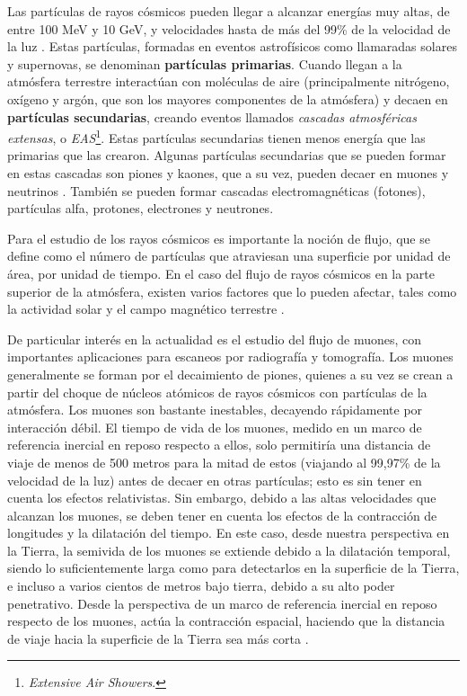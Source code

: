 \documentclass[12pt]{report}
\begin{document}
Las partículas de rayos cósmicos pueden llegar a alcanzar energías muy altas, de entre 100 MeV y 10 GeV, y velocidades hasta de más del 99\% de la velocidad de la luz \cite{moldwin2008introduction}. Estas partículas, formadas en eventos astrofísicos como llamaradas solares y supernovas, se denominan \textbf{partículas primarias}. Cuando llegan a la atmósfera terrestre interactúan con moléculas de aire (principalmente nitrógeno, oxígeno y argón, que son los mayores componentes de la atmósfera) y decaen en \textbf{partículas secundarias}, creando eventos llamados \textit{cascadas atmosféricas extensas}, o \textit{EAS}\footnote{\textit{Extensive Air Showers}.}. Estas partículas secundarias tienen menos energía que las primarias que las crearon. Algunas partículas secundarias que se pueden formar en estas cascadas son piones y kaones, que a su vez, pueden decaer en muones y neutrinos \cite{grieder2010extensive}. También se pueden formar cascadas electromagnéticas (fotones), partículas alfa, protones, electrones y neutrones.

Para el estudio de los rayos cósmicos es importante la noción de flujo, que se define como el número de partículas que atraviesan una superficie por unidad de área, por unidad de tiempo. En el caso del flujo de rayos cósmicos en la parte superior de la atmósfera, existen varios factores que lo pueden afectar, tales como la actividad solar y el campo magnético terrestre \cite{PhysRevD.98.030001}.

De particular interés en la actualidad es el estudio del flujo de muones, con importantes aplicaciones para escaneos por radiografía y tomografía. Los muones generalmente se forman por el decaimiento de piones, quienes a su vez se crean a partir del choque de núcleos atómicos de rayos cósmicos con partículas de la atmósfera. Los muones son bastante inestables, decayendo rápidamente por interacción débil. El tiempo de vida de los muones, medido en un marco de referencia inercial en reposo respecto a ellos, solo permitiría una distancia de viaje de menos de 500 metros para la mitad de estos (viajando al 99,97\% de la velocidad de la luz) antes de decaer en otras partículas; esto es sin tener en cuenta los efectos relativistas. Sin embargo, debido a las altas velocidades que alcanzan los muones, se deben tener en cuenta los efectos de la contracción de longitudes y la dilatación del tiempo. En este caso, desde nuestra perspectiva en la Tierra, la semivida de los muones se extiende debido a la dilatación temporal, siendo lo suficientemente larga como para detectarlos en la superficie de la Tierra, e incluso a varios cientos de metros bajo tierra, debido a su alto poder penetrativo. Desde la perspectiva de un marco de referencia inercial en reposo respecto de los muones, actúa la contracción espacial, haciendo que la distancia de viaje hacia la superficie de la Tierra sea más corta \cite{cunningham2019high}.
\end{document}
